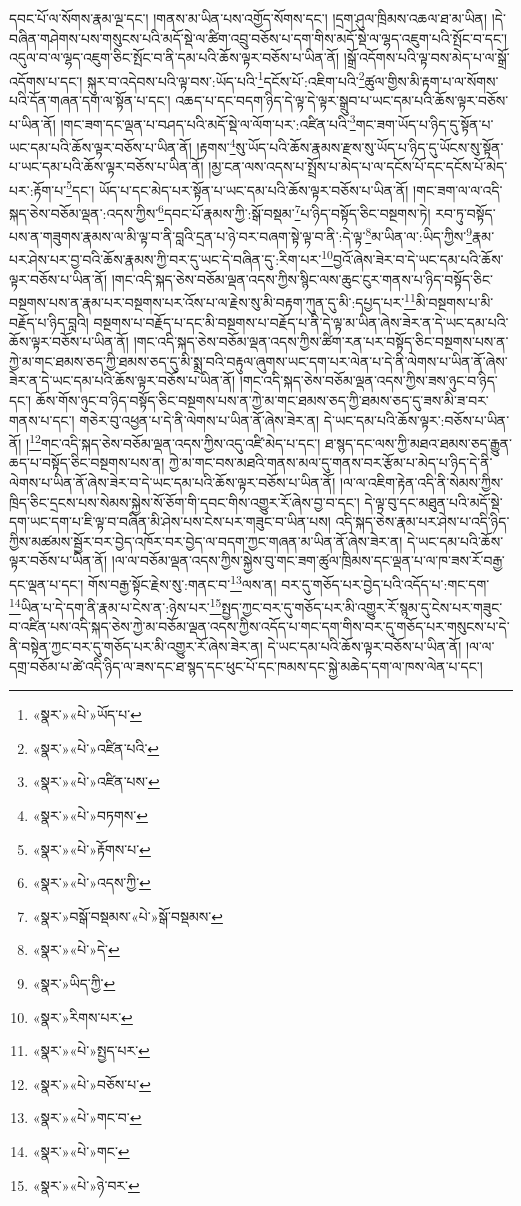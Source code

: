 དབང་པོ་ལ་སོགས་རྣམ་ལྔ་དང་། །གནས་མ་ཡིན་པས་འགྱོད་སོགས་དང་། །དྲག་ཤུལ་ཁྲིམས་འཆལ་ཐ་མ་ཡིན། །དེ་བཞིན་གཤེགས་པས་གསུངས་པའི་མདོ་སྡེ་ལ་ཚིག་འབྲུ་བཅོས་པ་དག་གིས་མདོ་སྡེ་ལ་ལྷད་འཇུག་པའི་སྤོང་བ་དང་། འདུལ་བ་ལ་ལྷད་འཇུག་ཅིང་སྤོང་བ་ནི་དམ་པའི་ཆོས་ལྟར་བཅོས་པ་ཡིན་ནོ། །སྒྲོ་འདོགས་པའི་ལྟ་བས་མེད་པ་ལ་སྒྲོ་འདོགས་པ་དང་། སྐུར་བ་འདེབས་པའི་ལྟ་བས་:ཡོད་པའི་\footnote{«སྣར་»«པེ་»ཡོད་པ་}དངོས་པོ་:འཇིག་པའི་\footnote{«སྣར་»«པེ་»འཛིན་པའི་}ཚུལ་གྱིས་མི་རྟག་པ་ལ་སོགས་པའི་དོན་གཞན་དག་ལ་སྟོན་པ་དང་། འཆད་པ་དང་བདག་ཉིད་དེ་ལྟ་དེ་ལྟར་སྒྲུབ་པ་ཡང་དམ་པའི་ཆོས་ལྟར་བཅོས་པ་ཡིན་ནོ། །གང་ཟག་དང་ལྡན་པ་བཤད་པའི་མདོ་སྡེ་ལ་ལོག་པར་:འཛིན་པའི་\footnote{«སྣར་»«པེ་»འཛིན་པས་}གང་ཟག་ཡོད་པ་ཉིད་དུ་སྟོན་པ་ཡང་དམ་པའི་ཆོས་ལྟར་བཅོས་པ་ཡིན་ནོ། །རྟགས་\footnote{«སྣར་»«པེ་»བཏགས་}སུ་ཡོད་པའི་ཆོས་རྣམས་རྫས་སུ་ཡོད་པ་ཉིད་དུ་ཡོངས་སུ་སྟོན་པ་ཡང་དམ་པའི་ཆོས་ལྟར་བཅོས་པ་ཡིན་ནོ། །མྱ་ངན་ལས་འདས་པ་སྤྲོས་པ་མེད་པ་ལ་དངོས་པོ་དང་དངོས་པོ་མེད་པར་:རྟོག་པ་\footnote{«སྣར་»«པེ་»རྟོགས་པ་}དང་། ཡོད་པ་དང་མེད་པར་སྟོན་པ་ཡང་དམ་པའི་ཆོས་ལྟར་བཅོས་པ་ཡིན་ནོ། །གང་ཟག་ལ་ལ་འདི་སྐད་ཅེས་བཅོམ་ལྡན་:འདས་ཀྱིས་\footnote{«སྣར་»«པེ་»འདས་ཀྱི་}དབང་པོ་རྣམས་ཀྱི་:སྒོ་བསྡམ་\footnote{«སྣར་»བསྒོ་བསྡམས་«པེ་»སྒོ་བསྡམས་}པ་ཉིད་བསྟོད་ཅིང་བསྔགས་ཏེ། རབ་ཏུ་བསྟོད་པས་ན་གཟུགས་རྣམས་ལ་མི་ལྟ་བ་ནི་བླའི་དྲན་པ་ཉེ་བར་བཞག་སྟེ་ལྟ་བ་ནི་:དེ་ལྟ་\footnote{«སྣར་»«པེ་»དེ་}མ་ཡིན་ལ་:ཡིད་ཀྱིས་\footnote{«སྣར་»ཡིད་ཀྱི་}རྣམ་པར་ཤེས་པར་བྱ་བའི་ཆོས་རྣམས་ཀྱི་བར་དུ་ཡང་དེ་བཞིན་དུ་:རིག་པར་\footnote{«སྣར་»རིགས་པར་}བྱའོ་ཞེས་ཟེར་བ་དེ་ཡང་དམ་པའི་ཆོས་ལྟར་བཅོས་པ་ཡིན་ནོ། །གང་འདི་སྐད་ཅེས་བཅོམ་ལྡན་འདས་ཀྱིས་སྙིང་ལས་ཆུང་ངུར་གནས་པ་ཉིད་བསྟོད་ཅིང་བསྔགས་པས་ན་རྣམ་པར་བསྔགས་པར་འོས་པ་ལ་རྗེས་སུ་མི་བརྟག་ཀུན་དུ་མི་:དཔྱད་པར་\footnote{«སྣར་»«པེ་»སྤྱད་པར་}མི་བསྔགས་པ་མི་བརྗོད་པ་ཉིད་བླའི། བསྔགས་པ་བརྗོད་པ་དང་མི་བསྔགས་པ་བརྗོད་པ་ནི་དེ་ལྟ་མ་ཡིན་ཞེས་ཟེར་ན་དེ་ཡང་དམ་པའི་ཆོས་ལྟར་བཅོས་པ་ཡིན་ནོ། །གང་འདི་སྐད་ཅེས་བཅོམ་ལྡན་འདས་ཀྱིས་ཚིག་རན་པར་བསྟོད་ཅིང་བསྔགས་པས་ན་ཀྱེ་མ་གང་ཐམས་ཅད་ཀྱི་ཐམས་ཅད་དུ་མི་སྨྲ་བའི་བརྟུལ་ཞུགས་ཡང་དག་པར་ལེན་པ་དེ་ནི་ལེགས་པ་ཡིན་ནོ་ཞེས་ཟེར་ན་དེ་ཡང་དམ་པའི་ཆོས་ལྟར་བཅོས་པ་ཡིན་ནོ། །གང་འདི་སྐད་ཅེས་བཅོམ་ལྡན་འདས་ཀྱིས་ཟས་ཉུང་བ་ཉིད་དང་། ཆོས་གོས་ཉུང་བ་ཉིད་བསྟོད་ཅིང་བསྔགས་པས་ན་ཀྱེ་མ་གང་ཐམས་ཅད་ཀྱི་ཐམས་ཅད་དུ་ཟས་མི་ཟ་བར་གནས་པ་དང་། གཅེར་བུ་འཕྱན་པ་དེ་ནི་ལེགས་པ་ཡིན་ནོ་ཞེས་ཟེར་ན། དེ་ཡང་དམ་པའི་ཆོས་ལྟར་:བཅོས་པ་ཡིན་ནོ། །\footnote{«སྣར་»«པེ་»བཅོས་པ་}གང་འདི་སྐད་ཅེས་བཅོམ་ལྡན་འདས་ཀྱིས་འདུ་འཛི་མེད་པ་དང་། ཐ་སྙད་དང་ལས་ཀྱི་མཐའ་ཐམས་ཅད་རྒྱུན་ཆད་པ་བསྟོད་ཅིང་བསྔགས་པས་ན། ཀྱེ་མ་གང་བས་མཐའི་གནས་མལ་དུ་གནས་བར་རྩོམ་པ་མེད་པ་ཉིད་དེ་ནི་ལེགས་པ་ཡིན་ནོ་ཞེས་ཟེར་བ་དེ་ཡང་དམ་པའི་ཆོས་ལྟར་བཅོས་པ་ཡིན་ནོ། །ལ་ལ་འཇིག་རྟེན་འདི་ནི་སེམས་ཀྱིས་ཁྲིད་ཅིང་དྲངས་པས་སེམས་སྐྱེས་སོ་ཅོག་གི་དབང་གིས་འགྱུར་རོ་ཞེས་བྱ་བ་དང་། དེ་ལྟ་བུ་དང་མཐུན་པའི་མདོ་སྡེ་དག་ཡང་དག་པ་ཇི་ལྟ་བ་བཞིན་མི་ཤེས་པས་ངེས་པར་གཟུང་བ་ཡིན་པས། འདི་སྐད་ཅེས་རྣམ་པར་ཤེས་པ་འདི་ཉིད་ཀྱིས་མཚམས་སྦྱོར་བར་བྱེད་འཁོར་བར་བྱེད་ལ་བདག་ཀྱང་གཞན་མ་ཡིན་ནོ་ཞེས་ཟེར་ན། དེ་ཡང་དམ་པའི་ཆོས་ལྟར་བཅོས་པ་ཡིན་ནོ། །ལ་ལ་བཅོམ་ལྡན་འདས་ཀྱིས་སྐྱེས་བུ་གང་ཟག་ཚུལ་ཁྲིམས་དང་ལྡན་པ་ལ་ཁ་ཟས་རོ་བརྒྱ་དང་ལྡན་པ་དང་། གོས་བརྒྱ་སྟོང་རྗེས་སུ་:གནང་བ་\footnote{«སྣར་»«པེ་»གང་བ་}ལས་ན། བར་དུ་གཅོད་པར་བྱེད་པའི་འདོད་པ་:གང་དག་\footnote{«སྣར་»«པེ་»གང་}ཡིན་པ་དེ་དག་ནི་རྣམ་པ་ངེས་ན་:ཉེས་པར་\footnote{«སྣར་»«པེ་»ཉེ་བར་}སྤྱད་ཀྱང་བར་དུ་གཅོད་པར་མི་འགྱུར་རོ་སྙམ་དུ་ངེས་པར་གཟུང་བ་འཛིན་པས་འདི་སྐད་ཅེས་ཀྱེ་མ་བཅོམ་ལྡན་འདས་ཀྱིས་འདོད་པ་གང་དག་གིས་བར་དུ་གཅོད་པར་གསུངས་པ་དེ་ནི་བསྟེན་ཀྱང་བར་དུ་གཅོད་པར་མི་འགྱུར་རོ་ཞེས་ཟེར་ན། དེ་ཡང་དམ་པའི་ཆོས་ལྟར་བཅོས་པ་ཡིན་ནོ། །ལ་ལ་དགྲ་བཅོམ་པ་ཚེ་འདི་ཉིད་ལ་ཟས་དང་ཐ་སྙད་དང་ཕུང་པོ་དང་ཁམས་དང་སྐྱེ་མཆེད་དག་ལ་ཁས་ལེན་པ་དང་། 
